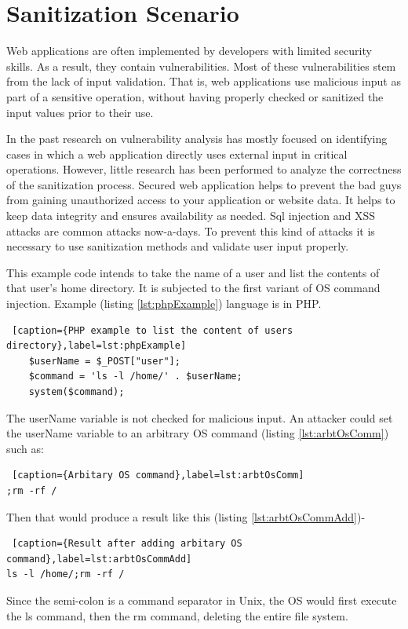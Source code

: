 \section{Sanitization Scenario}
Web applications are often implemented by developers with limited security skills. As a result, they
contain vulnerabilities. Most of these vulnerabilities stem
from the lack of input validation. That is, web applications
use malicious input as part of a sensitive operation, without having properly checked or sanitized the input values
prior to their use.

In the past research on vulnerability analysis has mostly focused on identifying cases in which a web application directly uses external input in critical operations. However,
little research has been performed to analyze the correctness of the sanitization process. Secured web application helps to prevent the bad guys from gaining unauthorized access to your application or website data. It helps to keep data integrity and ensures availability as needed. Sql injection and XSS attacks are common attacks now-a-days. To prevent this kind of attacks it is necessary to use sanitization methods and validate user input properly.

This example code intends to take the name of a user and list the contents of that user's home directory. It is subjected to the first variant of OS command injection. Example (listing \ref{lst:phpExample}) language is in PHP.

\begin{lstlisting} [caption={PHP example to list the content of users directory},label=lst:phpExample]
	$userName = $_POST["user"];
	$command = 'ls -l /home/' . $userName;
	system($command);
\end{lstlisting} 

The userName variable is not checked for malicious input. An attacker could set the userName variable to an arbitrary OS command (listing \ref{lst:arbtOsComm}) such as:
\begin{lstlisting} [caption={Arbitary OS command},label=lst:arbtOsComm]
;rm -rf /
\end{lstlisting}
Then that would produce a result like this (listing \ref{lst:arbtOsCommAdd})-
\begin{lstlisting} [caption={Result after adding arbitary OS command},label=lst:arbtOsCommAdd]
ls -l /home/;rm -rf /
\end{lstlisting}
Since the semi-colon is a command separator in Unix, the OS would first execute the ls command, then the rm command, deleting the entire file system.

